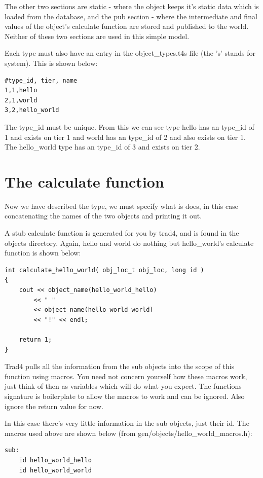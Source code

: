 \documentclass{report}
\begin{document}
The other two sections are static - where the object keeps it's static data which is loaded from the database, and the pub section - where the intermediate and final values of the object's calculate function are stored and published to the world. Neither of these two sections are used in this simple model.

Each type must also have an entry in the object_types.t4s file (the 's' stands for system). This is shown below:

\begin{verbatim}
#type_id, tier, name
1,1,hello
2,1,world
3,2,hello_world
\end{verbatim}


The type_id must be unique. From this we can see type hello has an type_id of 1 and exists on tier 1 and world has an type_id of 2 and also exists on tier 1. The hello_world type has an type_id of 3 and exists on tier 2.

\section{The calculate function}

Now we have described the type, we must specify what is does, in this case concatenating the names of the two objects and printing it out.

A stub calculate function is generated for you by trad4, and is found in the objects directory. Again, hello and world do nothing but hello_world's calculate function is shown below:

\begin{verbatim}
int calculate_hello_world( obj_loc_t obj_loc, long id )
{
    cout << object_name(hello_world_hello) 
        << " " 
        << object_name(hello_world_world) 
        << "!" << endl;

    return 1;
}
\end{verbatim}

Trad4 pulls all the information from the sub objects into the scope of this function using macros. You need not concern yourself how these macros work, just think of then as variables which will do what you expect. The functions signature is boilerplate to allow the macros to work and can be ignored. Also ignore the return value for now.

In this case there's very little information in the sub objects, just their id. The macros used above are shown below (from gen/objects/hello_world_macros.h):

\begin{verbatim}
sub:
    id hello_world_hello
    id hello_world_world
\end{verbatim}
\end{document}
